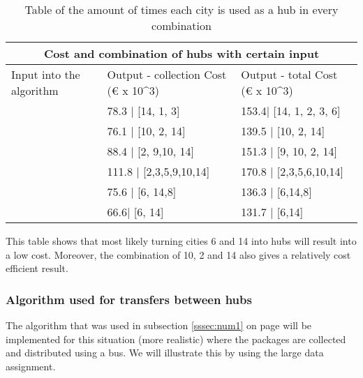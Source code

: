 \documentclass{article}
\begin{document}
             \begin{table}[h!]
                \begin{center}
                    \begin{tabular}{ |p{3cm}|p{4cm}|p{4cm}|}
                        \hline
                        \multicolumn{3}{|c|}{Cost and combination of hubs with certain input} \\
                        \hline
                        Input into the algorithm & Output -  collection Cost (€ x 10^3) & Output - total Cost (€ x 10^3)\\
                        \hline
                        [14] &  78.3 | [14, 1, 3] & 153.4| [14, 1, 2, 3, 6]  \\
                        \hline
                        [10] & 76.1 | [10, 2, 14]   & 139.5 | [10, 2, 14] \\
                        \hline
                        [9]& 88.4 | [2, 9,10, 14] & 151.3 |  [9, 10, 2, 14]\\
                        \hline
                        [2] &  111.8 | [2,3,5,9,10,14]  &  170.8 | [2,3,5,6,10,14] \\
                        \hline
                        [6, 14, 8] & 75.6 | [6, 14,8] & 136.3 | [6,14,8]  \\
                        \hline
                        [6, 14] & 66.6| [6, 14] & 131.7 | [6,14]  \\
                        \hline
                    \end{tabular}
                \end{center}
            \caption{Table of the amount of times each city is used as a hub in every combination}
            \label{amount of times hubs are used in collection expanded} 
            \end{table}
            
            This table shows that most likely turning cities 6 and 14 into hubs will result into a low cost. Moreover, the combination of 10, 2 and 14 also gives a relatively cost efficient result.

    
        \subsubsection{Algorithm used for transfers between hubs}
            The algorithm that was used in subsection \ref{sssec:num1} on page \pageref{sssec:num1} will be implemented for this situation (more realistic) where the packages are collected and distributed using a bus. We will illustrate this by using the large data assignment. 
\end{document}
